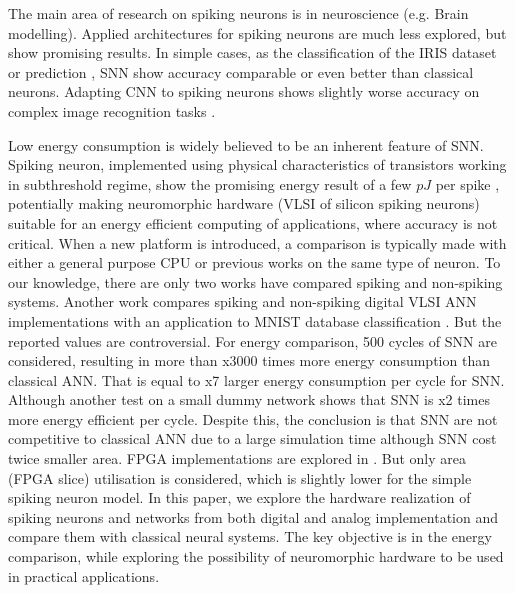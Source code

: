 \documentclass[conference, compsoc]{IEEEtran}
\begin{document}
The main area of research on spiking neurons is in neuroscience (e.g. Brain modelling). Applied architectures for spiking neurons are much less explored, but show promising results. In simple cases, as the classification of the IRIS dataset \cite{Johnston2005} or prediction \cite{Johnson2009833}, SNN show accuracy comparable or even better than classical neurons. Adapting CNN to spiking neurons shows slightly worse accuracy on complex image recognition tasks \cite{SNN_DCNN_object_rec,threshold_balancing}.

Low energy consumption is widely believed to be an inherent feature of SNN. Spiking neuron, implemented using physical characteristics of transistors working in subthreshold regime, show the promising energy result of a few $ pJ $ per spike \cite{Indiveri,Phong,HardwareOrAnalog,Wijekoon_compact_silicon_circuit,Energy-Efficient-Neuron}, potentially making neuromorphic hardware (VLSI of silicon spiking neurons) suitable for an energy efficient computing of applications, where accuracy is not critical. When a new platform is introduced, a comparison is typically made with either a general purpose CPU or previous works on the same type of neuron. To our knowledge, there are only two works have compared spiking and non-spiking systems. Another work compares spiking and non-spiking digital VLSI ANN implementations with an application to MNIST database classification \cite{Temam:comparison}. But the reported values are controversial. For energy comparison, 500 cycles of SNN are considered, resulting in more than x3000 times more energy consumption than classical ANN. That is equal to x7 larger energy consumption per cycle for SNN. Although another test on a small dummy network shows that SNN is x2 times more energy efficient per cycle. Despite this, the conclusion is that SNN are not competitive to classical ANN due to a large simulation time although SNN cost twice smaller area. FPGA implementations are explored in \cite{Johnston2005}. But only area (FPGA slice) utilisation is considered, which is slightly lower for the simple spiking neuron model. In this paper, we explore the hardware realization of spiking neurons and networks from both digital and analog implementation and compare them with classical neural systems. The key objective is in the energy comparison, while exploring the possibility of neuromorphic hardware to be used in practical applications.
\end{document}
